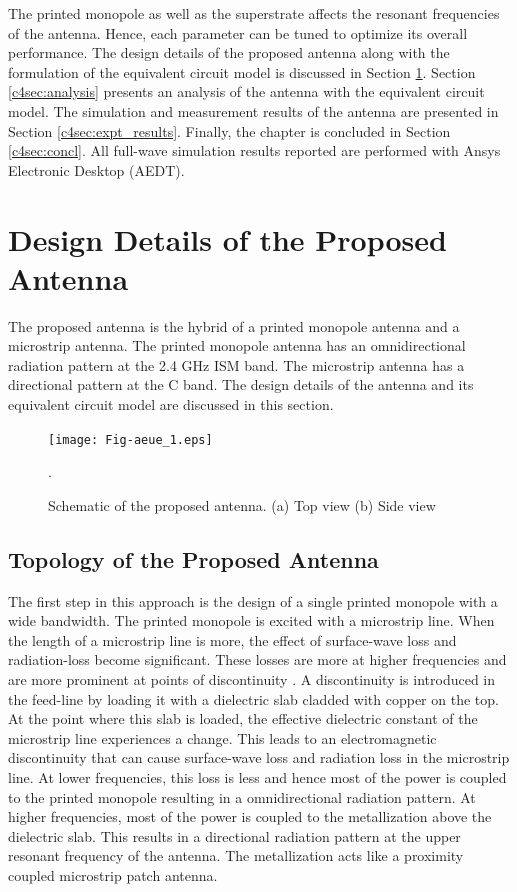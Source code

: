 The printed monopole as well as the superstrate affects the resonant frequencies of the antenna. Hence, each parameter can be tuned to optimize its overall performance. The design details of the proposed antenna along with the formulation of the equivalent circuit model is discussed in Section \ref{c4sec:design}. Section \ref{c4sec:analysis} presents an analysis of the antenna with the equivalent circuit model. The simulation and measurement results of the antenna are presented in Section \ref{c4sec:expt_results}. Finally, the chapter is concluded in Section \ref{c4sec:concl}. All full-wave simulation results reported are performed with Ansys Electronic Desktop (AEDT).
\section{Design Details of the Proposed Antenna}\label{c4sec:design}
The proposed antenna is the hybrid of a printed monopole antenna and a microstrip antenna. The printed monopole antenna has an omnidirectional radiation pattern at the 2.4 GHz ISM band. The microstrip antenna has a directional pattern at the C band. 
The design details of the antenna and its equivalent circuit model are discussed in this section.

\begin{figure}[t]
\centering
\texttt{[image: Fig-aeue\_1.eps]}
\caption{Schematic of the proposed antenna. (a) Top view (b) Side view}\label{topology}.
\end{figure}

\subsection{Topology of the Proposed Antenna}
The first step in this approach is the design of a single printed monopole with a wide bandwidth. The printed monopole is excited with a microstrip line. When the length of a microstrip line is more, the effect of surface-wave loss and radiation-loss become significant. These losses are more at higher frequencies and are more prominent at points of discontinuity \cite{rad_loss}. A discontinuity is introduced in the feed-line by loading it with a dielectric slab cladded with copper on the top. At the point where this slab is loaded, the effective dielectric constant of the microstrip line experiences a change. This leads to an electromagnetic discontinuity that can cause surface-wave loss and radiation loss in the microstrip line. At lower frequencies, this loss is less and hence most of the power is coupled to the printed monopole resulting in a omnidirectional radiation pattern. At higher frequencies, most of the power is coupled to the metallization above the dielectric slab. This results in a directional radiation pattern at the upper resonant frequency of the antenna. The metallization acts like a proximity coupled microstrip patch antenna.

